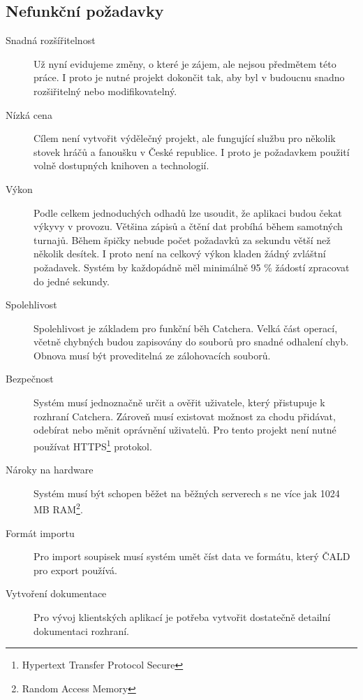 \subsection{Nefunkční požadavky}

\begin{description}
  \item[Snadná rozšířitelnost]
    Už nyní evidujeme změny, o které je zájem, ale nejsou předmětem této práce.
    I proto je nutné projekt dokončit tak, aby byl v budoucnu snadno rozšiřitelný nebo
    modifikovatelný.
  \item[Nízká cena]
    Cílem není vytvořit výdělečný projekt, ale fungující službu pro několik stovek hráčů
    a fanoušku v České republice. I proto je požadavkem použití volně dostupných
    knihoven a technologií.
  \item[Výkon]
    Podle celkem jednoduchých odhadů lze usoudit, že aplikaci budou čekat výkyvy v provozu.
    Většina zápisů a čtění dat probíhá během samotných turnajů. Během špičky nebude počet požadavků za sekundu
    větší než několik desítek. I proto není na celkový výkon kladen žádný zvláštní požadavek.
    Systém by každopádně měl minimálně 95 \% žádostí zpracovat do jedné sekundy.
  \item[Spolehlivost]
    Spolehlivost je základem pro funkční běh Catchera. Velká část operací, včetně chybných budou
    zapisovány do souborů pro snadné odhalení chyb. Obnova musí být proveditelná ze zálohovacích souborů.
    \item[Bezpečnost]
    Systém musí jednoznačně určit a ověřit uživatele, který přistupuje k rozhraní Catchera. Zároveň
    musí existovat možnost za chodu přidávat, odebírat nebo měnit oprávnění uživatelů.
    Pro tento projekt není nutné používat HTTPS\footnote{Hypertext Transfer Protocol Secure} protokol.
  \item[Nároky na hardware]
    Systém musí být schopen běžet na běžných serverech s ne více jak 1024 MB RAM\footnote{Random Access Memory}.
  \item[Formát importu]
    Pro import soupisek musí systém umět číst data ve formátu, který ČALD pro export používá.
  \item[Vytvoření dokumentace]
    Pro vývoj klientských aplikací je potřeba vytvořit dostatečně detailní dokumentaci rozhraní.
\end{description}


